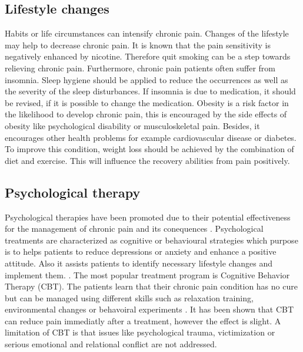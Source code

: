 \subsection{Lifestyle changes}
Habits or life circumstances can intensify chronic pain. Changes of the lifestyle may help to decrease chronic pain. It is known that the pain sensitivity is negatively enhanced by nicotine. Therefore quit smoking can be a step towards relieving chronic pain.
Furthermore, chronic pain patients often suffer from insomnia. Sleep hygiene should be applied to reduce the occurrences as well as the severity of the sleep disturbances. If insomnia is due to medication, it should be revised, if it is possible to change the medication.
Obesity is a risk factor in the likelihood to  develop chronic pain, this is encouraged by the side effects of obesity like psychological disability or musculoskeletal pain. Besides, it encourages other health problems for example cardiovascular disease or diabetes. To improve this condition, weight loss should be achieved by the combination of diet and exercise. This will influence the recovery abilities from pain positively. \cite{marcus2009,pope2017}

\subsection{Psychological therapy}

Psychological therapies have been promoted due to their potential effectiveness for the management of chronic pain and its conequences \cite{Eccleston2002}. Psychological treatments are characterized as cognitive or behavioural strategies \cite{Eccleston2013}which purpose is to helps patients to reduce depressions or anxiety and enhance a positive attitude. Also it assists patients to identify necessary lifestyle changes and implement them. \cite{marcus2009,pope2017}. The most popular treatment program is Cognitive Behavior Therapy (CBT). The patients learn that their chronic pain condition has no cure but can be managed using different skills such as relaxation training, environmental changes or behavoiral experiments \cite{Burger2016}. It has been shown that CBT can reduce pain immediatly after a treatment, however the effect is slight\cite{Eccleston2013}. A limitation of CBT is that issues like psychological trauma, victimization or serious emotional and relational conflict are not addressed.

